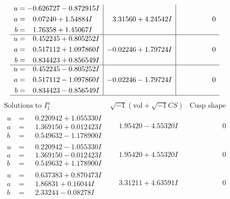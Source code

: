 \documentclass[1p]{elsarticle_modified}
\theoremstyle{definition}
\newcommand{\I}{\sqrt{-1}}
\begin{document}
$$\begin{array}{c|c|c}
\begin{aligned}
u &= -0.626727 - 0.872915 I \\
a &= \phantom{-}0.07240 + 1.54884 I \\
b &= \phantom{-}1.76358 + 1.45067 I\end{aligned}
 & \phantom{-}3.31560 + 4.24542 I & \phantom{-0.000000 } 0 \\ \hline\begin{aligned}
u &= \phantom{-}0.452245 + 0.805252 I \\
a &= \phantom{-}0.517112 + 1.097860 I \\
b &= \phantom{-}0.834423 + 0.856549 I\end{aligned}
 & -0.02246 + 1.79724 I & \phantom{-0.000000 } 0 \\ \hline\begin{aligned}
u &= \phantom{-}0.452245 - 0.805252 I \\
a &= \phantom{-}0.517112 - 1.097860 I \\
b &= \phantom{-}0.834423 - 0.856549 I\end{aligned}
 & -0.02246 - 1.79724 I & \phantom{-0.000000 } 0\\
 \hline 
 \end{array}$$\newpage$$\begin{array}{c|c|c}  
\text{Solutions to }I^u_{1}& \I (\text{vol} + \sqrt{-1}CS) & \text{Cusp shape}\\
 \hline 
\begin{aligned}
u &= \phantom{-}0.220942 + 1.055330 I \\
a &= \phantom{-}1.369150 + 0.012423 I \\
b &= \phantom{-}0.549632 - 1.178900 I\end{aligned}
 & \phantom{-}1.95420 - 4.55320 I & \phantom{-0.000000 } 0 \\ \hline\begin{aligned}
u &= \phantom{-}0.220942 - 1.055330 I \\
a &= \phantom{-}1.369150 - 0.012423 I \\
b &= \phantom{-}0.549632 + 1.178900 I\end{aligned}
 & \phantom{-}1.95420 + 4.55320 I & \phantom{-0.000000 } 0 \\ \hline\begin{aligned}
u &= \phantom{-}0.637383 + 0.870473 I \\
a &= \phantom{-}1.86831 + 0.16044 I \\
b &= \phantom{-}2.33244 - 0.08278 I\end{aligned}
 & \phantom{-}3.31211 + 4.63591 I & \phantom{-0.000000 } 0 \\ \hline\begin{aligned}

\end{aligned}
\end{array}$$
\end{document}
